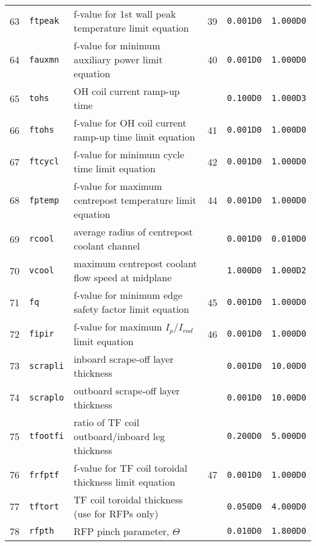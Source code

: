 \documentclass[11pt,a4paper]{report}
\begin{document}
\begin{table}[tbph]
\begin{center}
\begin{tabular}{||c|l|l|c|c|c||}
63  & \texttt{ftpeak}   & f-value for 1st wall peak temperature limit equation    & 39  & \texttt{0.001D0} & \texttt{1.000D0} \\
64  & \texttt{fauxmn}   & f-value for minimum auxiliary power limit equation      & 40  & \texttt{0.001D0} & \texttt{1.000D0} \\
65  & \texttt{tohs}     & OH coil current ramp-up time                            &     & \texttt{0.100D0} & \texttt{1.000D3} \\
66  & \texttt{ftohs}    & f-value for OH coil current ramp-up time limit equation & 41  & \texttt{0.001D0} & \texttt{1.000D0} \\
67  & \texttt{ftcycl}   & f-value for minimum cycle time limit equation           & 42  & \texttt{0.001D0} & \texttt{1.000D0} \\
68  & \texttt{fptemp}   & f-value for maximum centrepost temperature limit equation & 44  & \texttt{0.001D0} & \texttt{1.000D0} \\
69  & \texttt{rcool}    & average radius of centrepost coolant channel            &     & \texttt{0.001D0} & \texttt{0.010D0} \\
70  & \texttt{vcool}    & maximum centrepost coolant flow speed at midplane       &     & \texttt{1.000D0} & \texttt{1.000D2} \\
71  & \texttt{fq}       & f-value for minimum edge safety factor limit equation   & 45  & \texttt{0.001D0} & \texttt{1.000D0} \\
72  & \texttt{fipir}    & f-value for maximum $I_p/I_{rod}$ limit equation         & 46  & \texttt{0.001D0} & \texttt{1.000D0} \\
73  & \texttt{scrapli}  & inboard scrape-off layer thickness                      &     & \texttt{0.001D0} & \texttt{10.00D0} \\
74  & \texttt{scraplo}  & outboard scrape-off layer thickness                     &     & \texttt{0.001D0} & \texttt{10.00D0} \\
75  & \texttt{tfootfi}  & ratio of TF coil outboard/inboard leg thickness         &     & \texttt{0.200D0} & \texttt{5.000D0} \\
76  & \texttt{frfptf}   & f-value for TF coil toroidal thickness limit equation   & 47  & \texttt{0.001D0} & \texttt{1.000D0} \\
77  & \texttt{tftort}   & TF coil toroidal thickness (use for RFPs only)          &     & \texttt{0.050D0} & \texttt{4.000D0} \\
78  & \texttt{rfpth}    & RFP pinch parameter, $\Theta$                           &     & \texttt{0.010D0} & \texttt{1.800D0} \\

\end{tabular}
\end{center}
\end{table}
\end{document}
